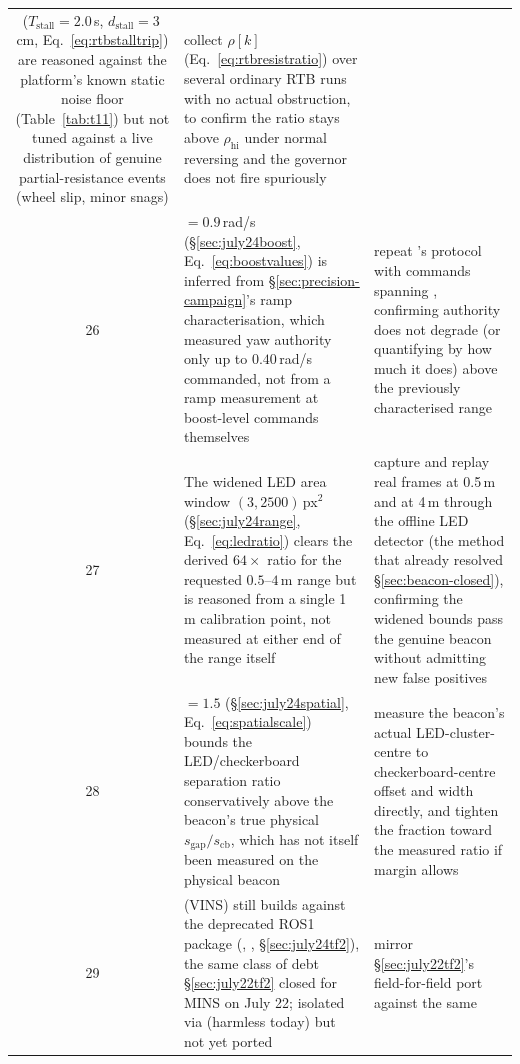 \begin{longtable}{@{}cL{6.2cm}L{6.8cm}@{}}
    ($T_{\text{stall}}=2.0$\,s, $d_{\text{stall}}=3$\,cm, Eq.~\ref{eq:rtbstalltrip})
    are reasoned against the platform's known static noise floor
    (Table~\ref{tab:t11}) but not tuned against a live distribution of
    genuine partial-resistance events (wheel slip, minor snags) &
    collect $\rho[k]$ (Eq.~\ref{eq:rtbresistratio}) over several ordinary
    RTB runs with no actual obstruction, to confirm the ratio stays above
    $\rho_{\text{hi}}$ under normal reversing and the governor does not
    fire spuriously \\
26 & $=0.9$\,rad/s (\S\ref{sec:july24boost},
    Eq.~\ref{eq:boostvalues}) is inferred from
    \S\ref{sec:precision-campaign}'s ramp characterisation, which measured
    yaw authority only up to $0.40$\,rad/s commanded, not from a ramp
    measurement at boost-level commands themselves &
    repeat 's protocol with commands spanning
    , confirming authority does not degrade (or
    quantifying by how much it does) above the previously characterised
    range \\
27 & The widened LED area window $(3,2500)$\,px$^2$
    (\S\ref{sec:july24range}, Eq.~\ref{eq:ledratio}) clears the derived
    $64\times$ ratio for the requested $0.5$--$4$\,m range but is reasoned
    from a single 1\,m calibration point, not measured at either end of
    the range itself &
    capture and replay real frames at 0.5\,m and at 4\,m through the
    offline LED detector (the method that already resolved
    \S\ref{sec:beacon-closed}), confirming the widened bounds pass the
    genuine beacon without admitting new false positives \\
28 & $=1.5$
    (\S\ref{sec:july24spatial}, Eq.~\ref{eq:spatialscale}) bounds the
    LED/checkerboard separation ratio conservatively above the beacon's
    true physical $s_{\text{gap}}/s_{\text{cb}}$, which has not itself
    been measured on the physical beacon &
    measure the beacon's actual LED-cluster-centre to
    checkerboard-centre offset and width directly, and tighten the
    fraction toward the measured ratio if margin allows \\
29 &  (VINS) still builds against the deprecated ROS1
     package (,
    , \S\ref{sec:july24tf2}), the same class
    of debt \S\ref{sec:july22tf2} closed for MINS on July 22; isolated via
     (harmless today) but not yet ported &
    mirror \S\ref{sec:july22tf2}'s field-for-field port against the same

\end{longtable}
